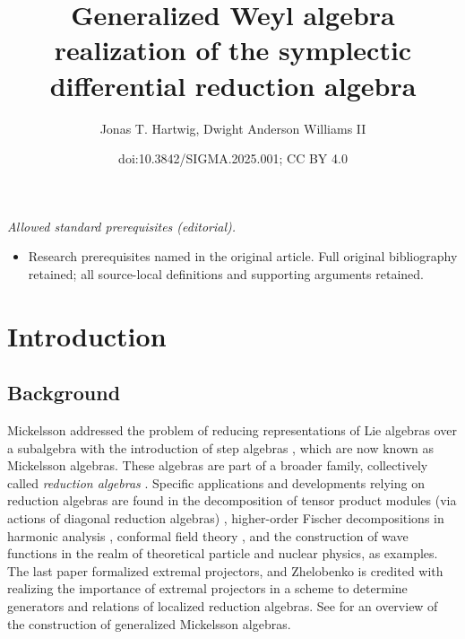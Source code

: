\documentclass[10pt,a4paper]{amsart}
\title{Generalized Weyl algebra realization of the symplectic differential reduction algebra}
\author{Jonas T. Hartwig, Dwight Anderson Williams II}
\date{doi:10.3842/SIGMA.2025.001; CC BY 4.0}
\numberwithin{equation}{section}
\begin{document}
\maketitle
\noindent\textit{Allowed standard prerequisites (editorial).}\begin{itemize}
\item Research prerequisites named in the original article. Full original bibliography retained; all source-local definitions and supporting arguments retained.
\end{itemize}\medskip
\section{Introduction}\label{sec:Intro}

\subsection{Background}\label{subsec:Background}
Mickelsson addressed the problem of reducing representations of Lie algebras over a subalgebra with the introduction of step algebras \cite{mickelssonStepAlgebrasSemisimple1973}, which are now known as Mickelsson algebras. These algebras are part of a broader family, collectively called \emph{reduction algebras} \cite{khoroshkinDiagonalReductionAlgebras2010}.
Specific applications and developments relying on reduction algebras are found in the decomposition of tensor product modules (via actions of diagonal reduction algebras) \cite{hartwigDiagonalReductionAlgebra2022c,khoroshkinDiagonalReductionAlgebras2010}, higher-order Fischer decompositions in harmonic analysis \cite{debieHarmonicTransvectorAlgebra2017}, conformal field theory \cite{conleyBoundedLengthRepresentations2001,conleyConformalSymbolsAction2009}, and the construction of wave functions \cite{asherovaProjectionOperatorsSimple1973} in the realm of theoretical particle and nuclear physics, as examples. The last paper formalized extremal projectors, and Zhelobenko \cite{zhelobenkoExtremalProjectorsGeneralized1989} is credited with realizing the importance of extremal projectors in a scheme to determine generators and relations of localized reduction algebras. See \cite{zhelobenkoPrincipalStructuresMethods2006} for an overview of the construction of generalized Mickelsson algebras.
\end{document}
